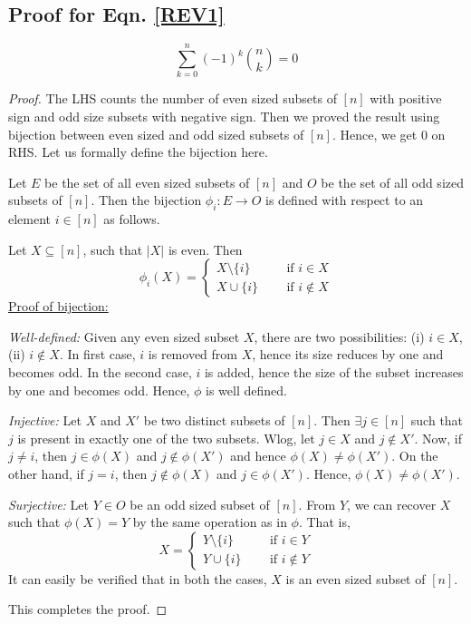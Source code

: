 \subsection{Proof for Eqn. \eqref{REV1}} \label{subsec:identity-even-odd-1}
$$\sum_{k=0}^n (-1)^k{n\choose k} = 0$$
\begin{proof}
    The LHS counts the number of even sized subsets of $[n]$ with positive sign and odd size subsets with negative sign. Then we proved the result using bijection between even sized and odd sized subsets of $[n]$. Hence, we get 0 on RHS. Let us formally define the bijection here.
    
    Let $E$ be the set of all even sized subsets of $[n]$ and $O$ be the set of all odd sized subsets of $[n]$. Then the bijection  $\phi_i:E\rightarrow O$ is defined with respect to an element $i\in[n]$ as follows.
    
    Let $X\subseteq [n]$, such that $|X|$ is even. Then 
    \[
        \phi_i(X) = 
        \begin{cases}
            X\setminus \{i\} & ~~~~~\text{ if } i\in X\\
            X\cup\{i\} & ~~~~~\text{ if } i\not\in X
        \end{cases}
    \]
    \underline{Proof of bijection:}
    \begin{description}
        \item \textit{Well-defined:} Given any even sized subset $X$, there are two possibilities: (i) $i\in X$, (ii) $i\not\in X$. In first case, $i$ is removed from $X$, hence its size reduces by one and becomes odd. In the second case, $i$ is added, hence the size of the subset increases by one and becomes odd. Hence, $\phi$ is well defined.
        \item \textit{Injective:} Let $X$ and $X'$ be two distinct subsets of $[n]$. Then $\exists j\in[n]$ such that $j$ is present in exactly one of the two subsets. Wlog, let $j\in X$ and $j\not\in X'$. Now, if $j\neq i$, then $j\in \phi(X)$ and $j\not\in \phi(X')$ and hence $\phi(X)\neq \phi(X')$. On the other hand, if $j=i$, then $j\not\in \phi(X)$ and $j\in \phi(X')$. Hence, $\phi(X)\neq \phi(X')$.  
        \item \textit{Surjective:} Let $Y\in O$ be an odd sized subset of $[n]$. From $Y$, we can recover $X$ such that $\phi(X) = Y$ by the same operation as in $\phi$. That is, 
        \[
        X= \begin{cases}
            Y\setminus \{i\} & ~~~~~\text{ if } i\in Y\\
            Y\cup\{i\} & ~~~~~\text{ if } i\not\in Y
        \end{cases}
        \]
        It can easily be verified that in both the cases, $X$ is an even sized subset of $[n]$.
    \end{description}
    This completes the proof.
\end{proof}
%
%

